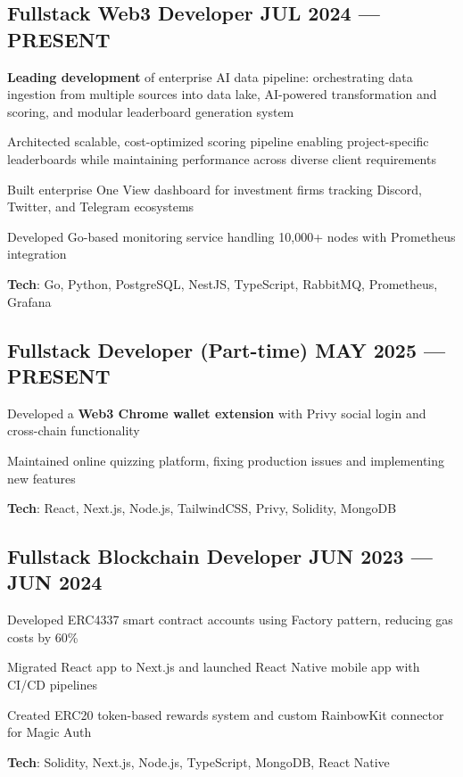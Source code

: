\subsection{{Fullstack Web3 Developer \hfill JUL 2024 --- PRESENT}}\begin{zitemize}\item \textbf{Leading development} of enterprise AI data pipeline: orchestrating data ingestion from multiple sources into data lake, AI-powered transformation and scoring, and modular leaderboard generation system\item Architected scalable, cost-optimized scoring pipeline enabling project-specific leaderboards while maintaining performance across diverse client requirements\item Built enterprise One View dashboard for investment firms tracking Discord, Twitter, and Telegram ecosystems\item Developed Go-based monitoring service handling 10,000+ nodes with Prometheus integration\item \textbf{Tech}: Go, Python, PostgreSQL, NestJS, TypeScript, RabbitMQ, Prometheus, Grafana\end{zitemize}\subsection{{Fullstack Developer (Part-time) \hfill MAY 2025 --- PRESENT}}\begin{zitemize}\item Developed a \textbf{Web3 Chrome wallet extension} with Privy social login and cross-chain functionality\item Maintained online quizzing platform, fixing production issues and implementing new features\item \textbf{Tech}: React, Next.js, Node.js, TailwindCSS, Privy, Solidity, MongoDB\end{zitemize}\subsection{{ Fullstack Blockchain Developer \hfill JUN 2023 --- JUN 2024}}\begin{zitemize}\item Developed ERC4337 smart contract accounts using Factory pattern, reducing gas costs by 60\%\item Migrated React app to Next.js and launched React Native mobile app with CI/CD pipelines\item Created ERC20 token-based rewards system and custom RainbowKit connector for Magic Auth\item \textbf{Tech}: Solidity, Next.js, Node.js, TypeScript, MongoDB, React Native\end{zitemize}